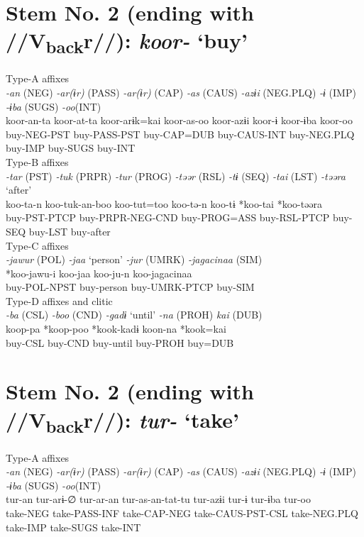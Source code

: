 \section{Stem No. 2 (ending with //V\textsubscript{back}r//): \textit{koor-} ‘buy’}

\ea Type-A affixes\\
\glll \textit{-an} (NEG)  \textit{-ar(ɨr)} (PASS)  \textit{-ar(ɨr)} (CAP)  \textit{-as} (CAUS)  \textit{-azɨi} (NEG.PLQ)  \textit{-ɨ} (IMP)  \textit{-ɨba} (SUGS)  \textit{-oo}(INT)\\
koor-an-ta  koor-at-ta  koor-arɨk=kai  koor-as-oo  koor-azɨi  koor-ɨ  koor-ɨba  koor-oo\\
buy-NEG-PST  buy-PASS-PST  buy-CAP=DUB  buy-CAUS-INT  buy-NEG.PLQ  buy-IMP  buy-SUGS  buy-INT\\


\ex Type-B affixes\\
\glll \textit{-tar} (PST)  \textit{-tuk} (PRPR)  \textit{-tur} (PROG)  \textit{-təər} (RSL)  \textit{-tɨ} (SEQ)  \textit{-tai} (LST)  \textit{-təəra} ‘after’\\
koo-ta-n  koo-tuk-an-boo  koo-tut=too  koo-tə-n  koo-tɨ  *koo-tai  *koo-təəra\\
buy-PST-PTCP  buy-PRPR-NEG-CND  buy-PROG=ASS  buy-RSL-PTCP  buy-SEQ  buy-LST  buy-after\\


\ex Type-C affixes\\
\glll \textit{-jawur} (POL)  \textit{-jaa} ‘person’  \textit{-jur} (UMRK)  \textit{-jagacinaa} (SIM)\\
*koo-jawu-i  koo-jaa  koo-ju-n  koo-jagacinaa\\
buy-POL-NPST  buy-person  buy-UMRK-PTCP  buy-SIM\\


\ex Type-D affixes and clitic\\
\glll \textit{-ba} (CSL)  \textit{-boo} (CND)  \textit{-gadɨ} ‘until’  \textit{-na} (PROH)  \textit{kai} (DUB)\\
koop-pa  *koop-poo  *kook-kadɨ  koon-na  *kook=kai\\
buy-CSL  buy-CND  buy-until  buy-PROH  buy=DUB\\
\z

\section{Stem No. 2 (ending with //V\textsubscript{back}r//): \textit{tur-} ‘take’}

\ea Type-A affixes\\
\glll \textit{-an} (NEG)  \textit{-ar(ɨr)} (PASS)  \textit{-ar(ɨr)} (CAP)  \textit{-as} (CAUS)  \textit{-azɨi} (NEG.PLQ)  \textit{-ɨ} (IMP)  \textit{-ɨba} (SUGS)  \textit{-oo}(INT)\\
tur-an  tur-arɨ-∅  tur-ar-an  tur-as-an-tat-tu  tur-azɨi  tur-ɨ  tur-ɨba  tur-oo\\
take-NEG  take-PASS-INF  take-CAP-NEG  take-CAUS-PST-CSL  take-NEG.PLQ  take-IMP  take-SUGS  take-INT\\


